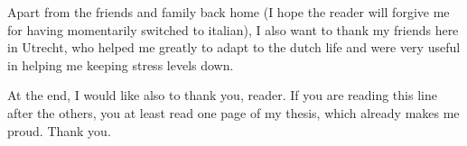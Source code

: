 Apart from the friends and family back home (I hope the reader will forgive me for having momentarily switched to italian), I also want to thank my friends here in Utrecht, who helped me greatly to adapt to the dutch life and were very useful in helping me keeping stress levels down.

At the end, I would like also to thank you, reader. If you are reading this line after the others, you at least read one page of my thesis, which already makes me proud. Thank you.
